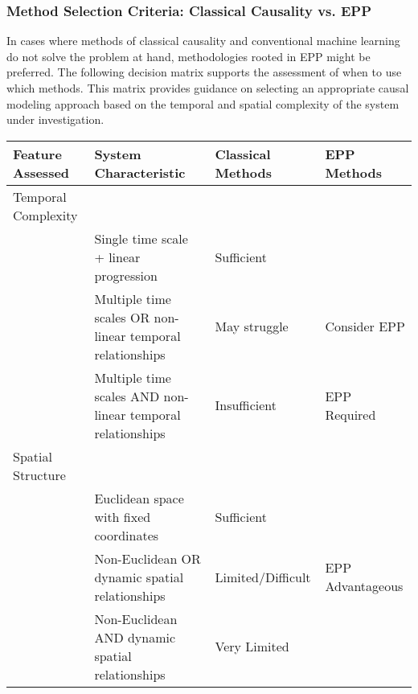 \documentclass{article}
\begin{document}
\subsubsection{Method Selection Criteria: Classical Causality vs. EPP}

In cases where methods of classical causality and conventional machine learning do not solve the problem at hand, methodologies rooted in EPP might be preferred. The following decision matrix supports the assessment of when to use which methods. This matrix provides guidance on selecting an appropriate causal modeling approach based on the temporal and spatial complexity of the system under investigation.

\begin{table}[hb]
\begin{tabular}{llll}
Feature Assessed &
  System Characteristic &
  Classical Methods &
  EPP Methods \\ \hline
\multicolumn{1}{|l|}{Temporal Complexity} &
  \multicolumn{1}{l|}{} &
  \multicolumn{1}{l|}{} &
  \multicolumn{1}{l|}{} \\ \hline
\multicolumn{1}{|l|}{} &
  \multicolumn{1}{l|}{Single time scale + linear progression} &
  \multicolumn{1}{l|}{Sufficient} &
  \multicolumn{1}{l|}{} \\ \hline
\multicolumn{1}{|l|}{} &
  \multicolumn{1}{l|}{Multiple time scales OR non-linear temporal relationships} &
  \multicolumn{1}{l|}{May struggle} &
  \multicolumn{1}{l|}{Consider EPP} \\ \hline
\multicolumn{1}{|l|}{} &
  \multicolumn{1}{l|}{Multiple time scales AND non-linear temporal relationships} &
  \multicolumn{1}{l|}{Insufficient} &
  \multicolumn{1}{l|}{EPP Required} \\ \hline
\multicolumn{1}{|l|}{Spatial Structure} &
  \multicolumn{1}{l|}{} &
  \multicolumn{1}{l|}{} &
  \multicolumn{1}{l|}{} \\ \hline
\multicolumn{1}{|l|}{} &
  \multicolumn{1}{l|}{Euclidean space with fixed coordinates} &
  \multicolumn{1}{l|}{Sufficient} &
  \multicolumn{1}{l|}{} \\ \hline
\multicolumn{1}{|l|}{} &
  \multicolumn{1}{l|}{Non-Euclidean OR dynamic spatial relationships} &
  \multicolumn{1}{l|}{Limited/Difficult} &
  \multicolumn{1}{l|}{EPP Advantageous} \\ \hline
\multicolumn{1}{|l|}{} &
  \multicolumn{1}{l|}{Non-Euclidean AND dynamic spatial relationships} &
  \multicolumn{1}{l|}{Very Limited} &

\end{tabular}
\end{table}
\end{document}
